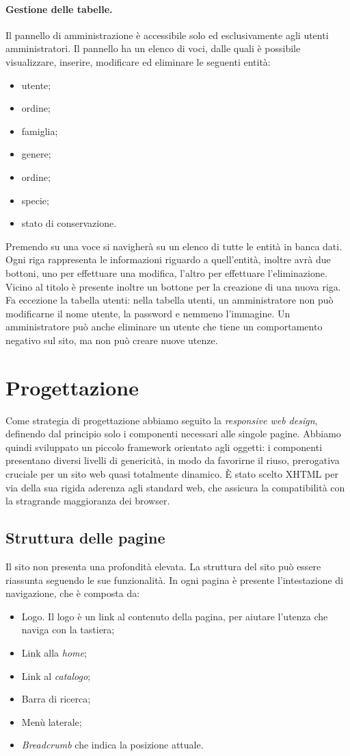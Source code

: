 \documentclass[12pt, a4paper]{article}
\begin{document}
\paragraph{Gestione delle tabelle.}
Il pannello di amministrazione è accessibile solo ed esclusivamente agli utenti amministratori. Il pannello ha un elenco di voci, dalle quali è possibile visualizzare, inserire, modificare ed eliminare le seguenti entità:
\begin{itemize}
\item utente;
\item ordine;
\item famiglia;
\item genere;
\item ordine;
\item specie;
\item stato di conservazione.
\end{itemize}
Premendo su una voce si navigherà su un elenco di tutte le entità in banca dati. Ogni riga rappresenta le informazioni riguardo a quell'entità, inoltre avrà due bottoni, uno per effettuare una modifica, l'altro per effettuare l'eliminazione. Vicino al titolo è presente inoltre un bottone per la creazione di una nuova riga. Fa eccezione la tabella utenti: nella tabella utenti, un amministratore non può modificarne il nome utente, la password e nemmeno l'immagine. Un amministratore può anche eliminare un utente che tiene un comportamento negativo sul sito, ma non può creare nuove utenze.
\section{Progettazione}
Come strategia di progettazione abbiamo seguito la \textit{responsive web design}, definendo dal principio solo i componenti necessari alle singole pagine. Abbiamo quindi sviluppato un piccolo framework orientato agli oggetti: i componenti presentano diversi livelli di genericità, in modo da favorirne il riuso, prerogativa cruciale per un sito web quasi totalmente dinamico.
È stato scelto XHTML per via della sua rigida aderenza agli standard web, che assicura la compatibilità con la stragrande maggioranza dei browser.
\subsection{Struttura delle pagine}
Il sito non presenta una profondità elevata. La struttura del sito può essere riassunta seguendo le sue funzionalità. In ogni pagina è presente l'intestazione di navigazione, che è composta da:
\begin{itemize}
\item Logo. Il logo è un link al contenuto della pagina, per aiutare l'utenza che naviga con la tastiera;
\item Link alla \textit{home};
\item Link al \textit{catalogo};
\item Barra di ricerca;
\item Menù laterale;
\item \textit{Breadcrumb} che indica la posizione attuale.
\end{itemize}
\end{document}
